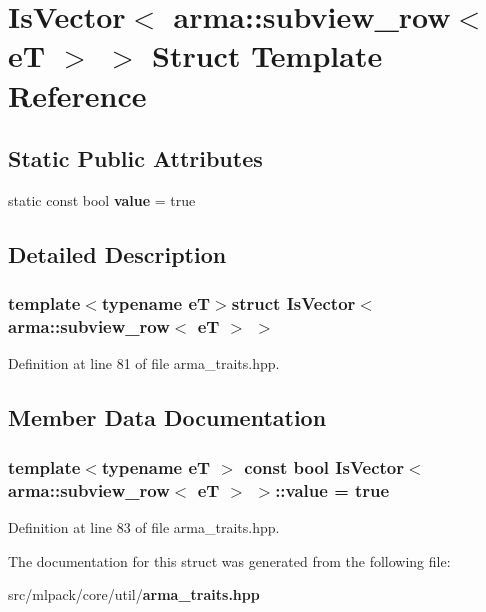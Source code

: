 \section{Is\-Vector$<$ arma\-:\-:subview\-\_\-row$<$ e\-T $>$ $>$ Struct Template Reference}
\label{structIsVector_3_01arma_1_1subview__row_3_01eT_01_4_01_4}
\subsection*{Static Public Attributes}
\begin{DoxyCompactItemize}
\item 
static const bool {\bf value} = true
\end{DoxyCompactItemize}


\subsection{Detailed Description}
\subsubsection*{template$<$typename e\-T$>$struct Is\-Vector$<$ arma\-::subview\-\_\-row$<$ e\-T $>$ $>$}



Definition at line 81 of file arma\-\_\-traits.\-hpp.



\subsection{Member Data Documentation}
\subsubsection[{value}]{\setlength{\rightskip}{0pt plus 5cm}template$<$typename e\-T $>$ const bool {\bf Is\-Vector}$<$ arma\-::subview\-\_\-row$<$ e\-T $>$ $>$\-::value = true\hspace{0.3cm}{\ttfamily [static]}}\label{structIsVector_3_01arma_1_1subview__row_3_01eT_01_4_01_4_aa89229a6d5fd4fd5b946217d20151c48}


Definition at line 83 of file arma\-\_\-traits.\-hpp.



The documentation for this struct was generated from the following file\-:\begin{DoxyCompactItemize}
\item 
src/mlpack/core/util/{\bf arma\-\_\-traits.\-hpp}\end{DoxyCompactItemize}
